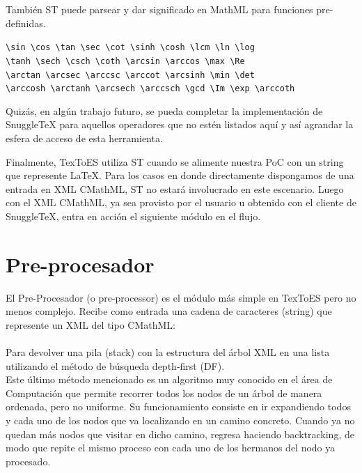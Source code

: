 También ST puede parsear y dar significado en MathML para funciones pre-definidas.

\begin{tcolorbox}
\verb|\sin \cos \tan \sec \cot \sinh \cosh \lcm \ln \log|\\
\verb|\tanh \sech \csch \coth \arcsin \arccos \max \Re| \\
\verb|\arctan \arcsec \arccsc \arccot \arcsinh \min \det|\\
\verb|\arccosh \arctanh \arcsech \arccsch \gcd \Im \exp \arccoth|
\end{tcolorbox}

Quizás, en algún trabajo futuro, se pueda completar la implementación de SnuggleTeX para aquellos operadores que no estén listados aquí y así agrandar la esfera de acceso de esta herramienta.

Finalmente, TexToES utiliza ST cuando se alimente nuestra PoC con un string que represente LaTeX. Para los casos en donde directamente dispongamos de una entrada en XML CMathML, ST no estará involucrado en este escenario.
Luego con el XML CMathML, ya sea provisto por el usuario u obtenido con el cliente de SnuggleTeX, entra en acción el siguiente módulo en el flujo.

\section{Pre-procesador}

El Pre-Procesador (o pre-processor) es el módulo más simple en TexToES pero no menos complejo. Recibe como entrada una cadena de caracteres (string) que represente un XML del tipo CMathML:\\[0.01cm]

\\[0.01cm]

Para devolver una pila (stack) con la estructura del árbol XML en una lista utilizando el método de búsqueda depth-first (DF).\\

Este último método mencionado es un algoritmo muy conocido en el área de Computación que permite recorrer todos los nodos de un árbol de manera ordenada, pero no uniforme. Su funcionamiento consiste en ir expandiendo todos y cada uno de los nodos que va localizando en un camino concreto. Cuando ya no quedan más nodos que visitar en dicho camino, regresa haciendo backtracking, de modo que repite el mismo proceso con cada uno de los hermanos del nodo ya procesado.\\

